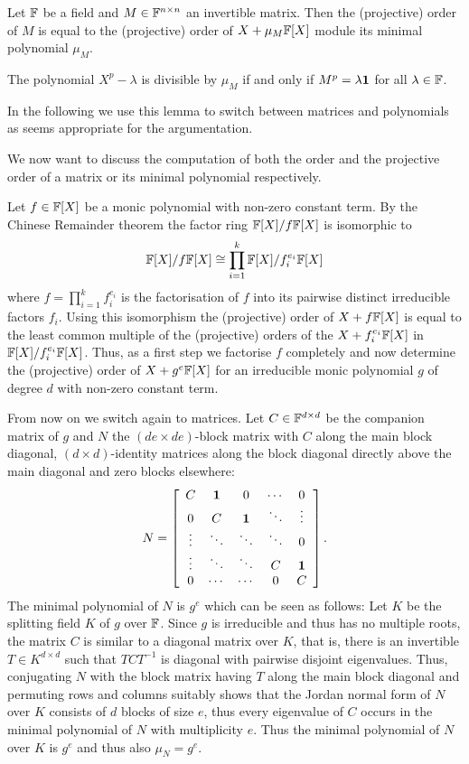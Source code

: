 \begin{Lemm}
Let $\mathbb{F}$ be a field and $M \in \mathbb{F}^{n \times n}$ an invertible matrix.
Then the (projective) order of $M$ is equal to the (projective) order of
$X + \mu_M \mathbb{F}[X]$ module its minimal polynomial $\mu_M$.
\end{Lemm}
\proofbeg 
The polynomial $X^p-\lambda$ is divisible by $\mu_M$ if and
only if $M^p = \lambda \mathbf{1}$ for all $\lambda \in \mathbb{F}$.
\proofend

In the following we use this lemma to switch between matrices and
polynomials as seems appropriate for the argumentation.

We now want to discuss the computation of both the order and the
projective order of a matrix or its minimal polynomial respectively.

Let $f \in \mathbb{F}[X]$ be a monic polynomial with non-zero constant term. 
By the Chinese Remainder theorem the factor ring
$\mathbb{F}[X]/f\mathbb{F}[X]$ is isomorphic to
\[ \mathbb{F}[X]/f\mathbb{F}[X] \cong
   \prod_{i=1}^k \mathbb{F}[X]/f_i^{e_i} \mathbb{F}[X] \]
where $f = \prod_{i=1}^k f_i^{e_i}$ is the factorisation of $f$ into
its pairwise distinct irreducible factors $f_i$. Using this
isomorphism the (projective) order of $X+f\mathbb{F}[X]$ is equal to the least 
common multiple of the (projective) orders of the $X + f_i^{e_i}
\mathbb{F}[X]$ in $\mathbb{F}[X]/f_i^{e_i}\mathbb{F}[X]$. Thus, as a first step we factorise
$f$ completely and now determine the (projective) order of
$X+g^e\mathbb{F}[X]$ for an irreducible monic polynomial $g$ of degree $d$ 
with non-zero constant term.

From now on we switch again to matrices. Let $C \in \mathbb{F}^{d \times d}$ be 
the companion matrix of $g$ and $N$ the $(de \times de)$-block matrix with 
$C$ along the main block diagonal, $(d \times d)$-identity matrices
along the block diagonal directly above the main diagonal and zero blocks
elsewhere:
\[ N = \left[ \begin{array}{ccccc}
    C      & \mathbf{1}   & 0      & \cdots & 0 \\
    0      & C      & \mathbf{1}   & \ddots & \vdots \\
    \vdots & \ddots & \ddots & \ddots & 0 \\
    \vdots & \ddots & \ddots & C      & \mathbf{1} \\
    0      & \cdots & \cdots & 0      & C
\end{array} \right]. \]
The minimal polynomial of $N$ is $g^e$ which can be seen as follows:
Let $K$ be the splitting field $K$ of $g$ over $\mathbb{F}$. Since $g$ is
irreducible and thus has no multiple roots, the 
matrix $C$ is similar to a diagonal matrix over $K$, that is, there is an
invertible $T \in K^{d \times d}$ such that $TCT^{-1}$ is diagonal
with pairwise disjoint eigenvalues.
Thus, conjugating $N$ with the block matrix having $T$ along the
main block diagonal and permuting rows and columns suitably shows that
the Jordan normal form of $N$ over $K$ consists of $d$ blocks of
size $e$, thus every eigenvalue of $C$ occurs in the minimal
polynomial of $N$ with multiplicity $e$. Thus the minimal polynomial
of $N$ over $K$ is $g^e$ and thus also $\mu_N = g^e$.

